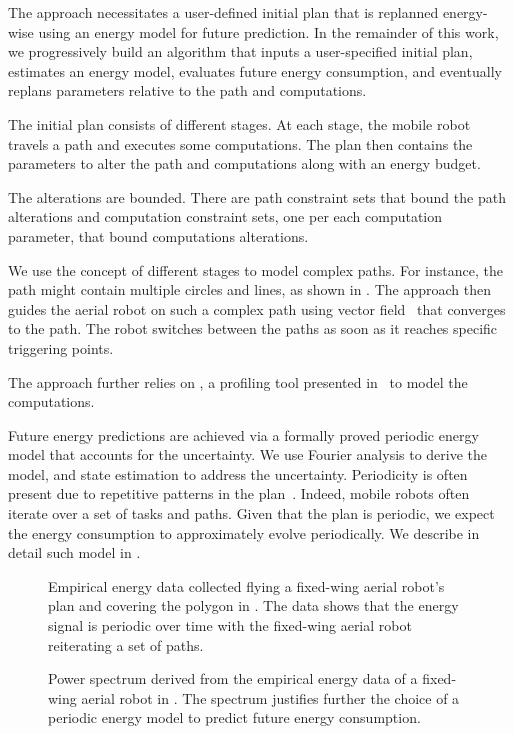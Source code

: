 The approach necessitates a user-defined initial plan that is replanned energy-wise using an energy model for future prediction. In the remainder of this work, we progressively build an algorithm that inputs a user-specified initial plan, estimates an energy model, evaluates future energy consumption, and eventually replans parameters relative to the path and computations. 

The initial plan consists of different stages. At each stage, the mobile robot travels a path and executes some computations. The plan then contains the parameters to alter the path and computations along with an energy budget.

The alterations are bounded. There are path constraint sets that bound the path alterations and computation constraint sets, one per each computation parameter, that bound computations alterations.

We use the concept of different stages to model complex paths. For instance, the path might contain multiple circles and lines, as shown in . The approach then guides the aerial robot on such a complex path using vector field~\citep{de2017guidance} that converges to the path. The robot switches between the paths as soon as it reaches specific triggering points. 

The approach further relies on \powprof{}, a profiling tool presented in~\citep{seewald2019coarse} to model the computations. 

Future energy predictions are achieved via a formally proved periodic energy model that accounts for the uncertainty. We use Fourier analysis to derive the model, and state estimation to address the uncertainty. Periodicity is often present due to repetitive patterns in the plan~\citep{seewald2020mechanical}. Indeed, mobile robots often iterate over a set of tasks and paths. Given that the plan is periodic, we expect the energy consumption to approximately evolve periodically. We describe in detail such model in . 

\begin{figure}[p]
  \centering
  \footnotesize{}
  
  \caption[Energy data of a fixed-wing aerial robot]{Empirical energy data collected flying a fixed-wing aerial robot's plan and covering the polygon in . The data shows that the energy signal is periodic over time with the fixed-wing aerial robot reiterating a set of paths.}
  \label{fig:energy-1}
\end{figure}
\begin{figure}[p]
  \centering
  \footnotesize{}
  
  \caption[Power spectrum of the energy data of a fixed-wing aerial robot]{Power spectrum derived from the empirical energy data of a fixed-wing aerial robot in . The spectrum justifies further the choice of a periodic energy model to predict future energy consumption.}
  \label{fig:spectrum-1}
\end{figure}

